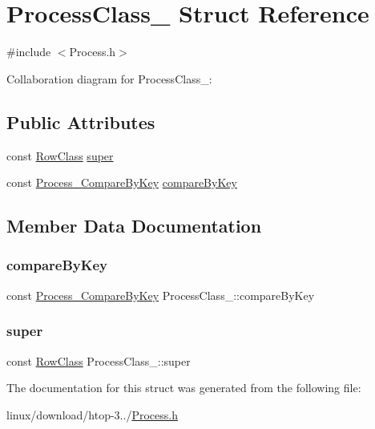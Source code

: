 \hypertarget{structProcessClass__}{}\section{Process\+Class\+\_\+ Struct Reference}
\label{structProcessClass__}


{\ttfamily \#include $<$Process.\+h$>$}



Collaboration diagram for Process\+Class\+\_\+\+:
\subsection*{Public Attributes}
\begin{DoxyCompactItemize}
\item 
const \hyperlink{Row_8h_ab1f9686cc24220df899c6d7d32551496}{Row\+Class} \hyperlink{structProcessClass___a16e614b45e2e442648cb7f201866cb20}{super}
\item 
const \hyperlink{Process_8h_a82d8aac4a6952b4dff7ac218adf9e92b}{Process\+\_\+\+Compare\+By\+Key} \hyperlink{structProcessClass___afa2ff98b95be8a91e353fe54896632c9}{compare\+By\+Key}
\end{DoxyCompactItemize}


\subsection{Member Data Documentation}
\mbox{\label{structProcessClass___afa2ff98b95be8a91e353fe54896632c9}} 
\subsubsection{\texorpdfstring{compare\+By\+Key}{compareByKey}}
{\footnotesize\ttfamily const \hyperlink{Process_8h_a82d8aac4a6952b4dff7ac218adf9e92b}{Process\+\_\+\+Compare\+By\+Key} Process\+Class\+\_\+\+::compare\+By\+Key}

\mbox{\label{structProcessClass___a16e614b45e2e442648cb7f201866cb20}} 
\subsubsection{\texorpdfstring{super}{super}}
{\footnotesize\ttfamily const \hyperlink{Row_8h_ab1f9686cc24220df899c6d7d32551496}{Row\+Class} Process\+Class\+\_\+\+::super}



The documentation for this struct was generated from the following file\+:\begin{DoxyCompactItemize}
\item 
linux/download/htop-\/3../\hyperlink{Process_8h}{Process.\+h}\end{DoxyCompactItemize}
